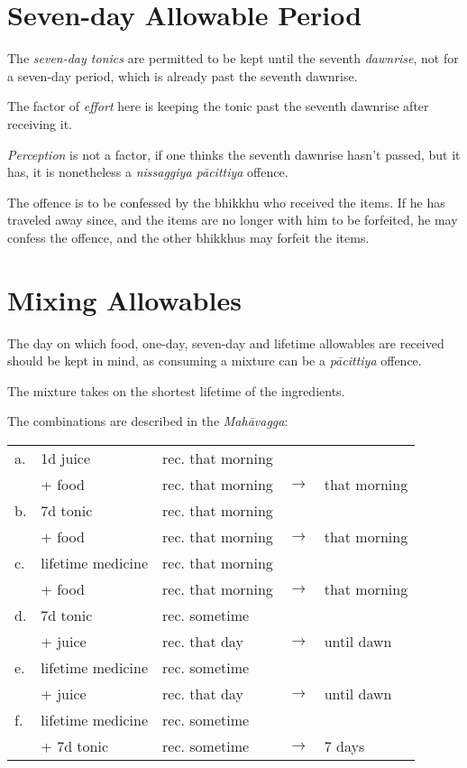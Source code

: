 \section*{Seven-day Allowable Period}

The \emph{seven-day tonics} are permitted to be kept until the seventh
\emph{dawnrise}, not for a seven-day period, which is already past the seventh
dawnrise.

The factor of \emph{effort} here is keeping the tonic past the seventh dawnrise
after receiving it.

\emph{Perception} is not a factor, if one thinks the seventh dawnrise hasn't
passed, but it has, it is nonetheless a \emph{nissaggiya pācittiya} offence.

The offence is to be confessed by the bhikkhu who received the items. If he has
traveled away since, and the items are no longer with him to be forfeited, he
may confess the offence, and the other bhikkhus may forfeit the items.

\clearpage

\section*{Mixing Allowables}

The day on which food, one-day, seven-day and lifetime allowables are received
should be kept in mind, as consuming a mixture can be a \emph{pācittiya}
offence.

The mixture takes on the shortest lifetime of the ingredients. 

The combinations are described in the \emph{Mahāvagga}:

\begin{tabular}{@{}lllll@{}}
  a. & 1d juice & rec. that morning & & \\
     &  + food     & rec. that morning & \(\rightarrow\) & that morning\\
  \hline
  b. & 7d tonic & rec. that morning & & \\
     & + food   & rec. that morning & \(\rightarrow\) & that morning\\
  \hline
  c. & lifetime medicine & rec. that morning & & \\
     & + food            & rec. that morning & \(\rightarrow\) & that morning\\
  \hline
  d. & 7d tonic & rec. sometime & & \\
     & + juice  & rec. that day & \(\rightarrow\) & until dawn\\
  \hline
  e. & lifetime medicine & rec. sometime & & \\
     & + juice           & rec. that day & \(\rightarrow\) & until dawn\\
  \hline
  f. & lifetime medicine & rec. sometime & & \\
     & + 7d tonic        & rec. sometime & \(\rightarrow\) & 7 days\\
\end{tabular}

